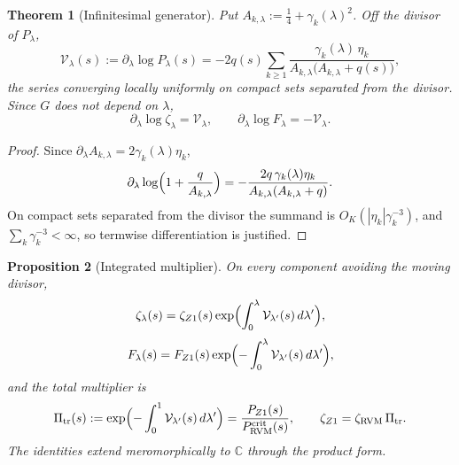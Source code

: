 \documentclass[11pt,reqno]{amsart}
\numberwithin{equation}{section}
\theoremstyle{plain}
\newtheorem{theorem}{Theorem}[section]
\newtheorem{proposition}[theorem]{Proposition}
\theoremstyle{definition}
\theoremstyle{remark}
\newcommand{\C}{\mathbb C}
\newcommand{\RVM}{\mathrm{RVM}}
\newcommand{\crit}{\mathrm{crit}}
\begin{document}
\begin{theorem}[Infinitesimal generator]\label{thm:generator}
Put $A_{k,\lambda}:=\tfrac14+\gamma_k(\lambda)^2$.  Off the divisor of $P_\lambda$,
\begin{equation}\label{eq:generator}
 \mathcal V_\lambda(s):=\partial_\lambda\log P_\lambda(s)=-2q(s)\sum_{k\ge1}\frac{\gamma_k(\lambda)\,\eta_k}{A_{k,\lambda}\bigl(A_{k,\lambda}+q(s)\bigr)},
\end{equation}
the series converging locally uniformly on compact sets separated from the divisor.  Since $G$ does not depend on $\lambda$,
\begin{equation}\label{eq:generator-zeta}
 \partial_\lambda\log\zeta_\lambda=\mathcal V_\lambda,\qquad \partial_\lambda\log F_\lambda=-\mathcal V_\lambda .
\end{equation}
\end{theorem}

\begin{proof}
Since $\partial_\lambda A_{k,\lambda}=2\gamma_k(\lambda)\eta_k$,
\begin{equation}\label{eq:mode-derivative}
 \partial_\lambda\log\Bigl(1+\frac q{A_{k,\lambda}}\Bigr)=-\frac{2q\,\gamma_k(\lambda)\eta_k}{A_{k,\lambda}(A_{k,\lambda}+q)} .
\end{equation}
On compact sets separated from the divisor the summand is $O_K(|\eta_k|\gamma_k^{-3})$, and $\sum_k\gamma_k^{-3}<\infty$, so termwise differentiation is justified.
\end{proof}

\begin{proposition}[Integrated multiplier]\label{prop:integrated-multiplier}
On every component avoiding the moving divisor,
\begin{equation}\label{eq:integrated-zeta}
 \zeta_\lambda(s)=\zeta_{Z1}(s)\exp\Bigl(\int_0^\lambda\mathcal V_{\lambda'}(s)\,d\lambda'\Bigr),
\end{equation}
\begin{equation}\label{eq:integrated-inverse}
 F_\lambda(s)=F_{Z1}(s)\exp\Bigl(-\int_0^\lambda\mathcal V_{\lambda'}(s)\,d\lambda'\Bigr),
\end{equation}
and the total multiplier is
\begin{equation}\label{eq:transport-multiplier}
 \Pi_{\rm tr}(s):=\exp\Bigl(-\int_0^1\mathcal V_{\lambda'}(s)\,d\lambda'\Bigr)=\frac{P_{Z1}(s)}{P_{\RVM}^{\crit}(s)},\qquad \zeta_{Z1}=\zeta_{\RVM}\,\Pi_{\rm tr} .
\end{equation}
The identities extend meromorphically to $\C$ through the product form.
\end{proposition}
\end{document}
